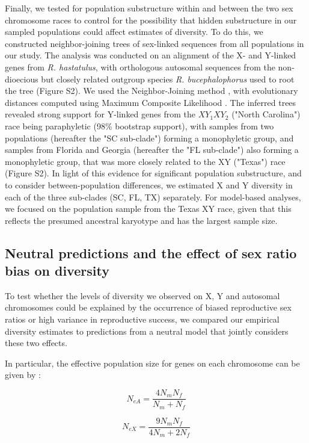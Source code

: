 \documentclass[9pt,twocolumn,twoside]{gsajnl}
\begin{document}
Finally, we tested for population substructure within and between the two sex chromosome races to control for the possibility that hidden substructure in our sampled populations could affect estimates of diversity. To do this, we constructed neighbor-joining trees of sex-linked sequences from all populations in our study. The analysis was conducted on an alignment of the X- and Y-linked genes from \textit{R. hastatulus}, with orthologous autosomal sequences from the non-dioecious but closely related outgroup species \textit{R. bucephalophorus} used to root the tree (Figure S2). We used the Neighbor-Joining method \citep{saitou1987neighbor}, with evolutionary distances computed using Maximum Composite Likelihood \citep{tamura2011mega5}. The inferred trees revealed strong support for Y-linked genes from the $XY_{1}XY_{2}$ ("North Carolina") race being paraphyletic (98\% bootstrap support), with samples from two populations (hereafter the "SC sub-clade") forming a monophyletic group, and samples from Florida and Georgia (hereafter the "FL sub-clade") also forming a monophyletic group, that was more closely related to the XY ("Texas") race (Figure S2). In light of this evidence for significant population substructure, and to consider between-population differences, we estimated X and Y diversity in each of the three sub-clades (SC, FL, TX) separately. For model-based analyses, we focused on the population sample from the Texas XY race, given that this reflects the presumed ancestral karyotype and has the largest sample size.

\subsection*{Neutral predictions and the effect of sex ratio bias on diversity}
To test whether the levels of diversity we observed on X, Y and autosomal chromosomes could be explained by the occurrence of biased reproductive sex ratios or high variance in reproductive success, we compared our empirical diversity estimates to predictions from a neutral model that jointly considers these two effects.


In particular, the effective population size for genes on each chromosome can be given by  \citep{wright1931evolution}:

\begin{equation}
N_{e{A}} = \frac{4N_{m}N_{f}}{N_{m}+N_{f}}\label{eq:NeA}
\end{equation}


\begin{equation}
N_{e{X}} = \frac{9N_{m}N_{f}}{4N_{m}+2N_{f}}\label{eq:NeX}
\end{equation}
\end{document}
